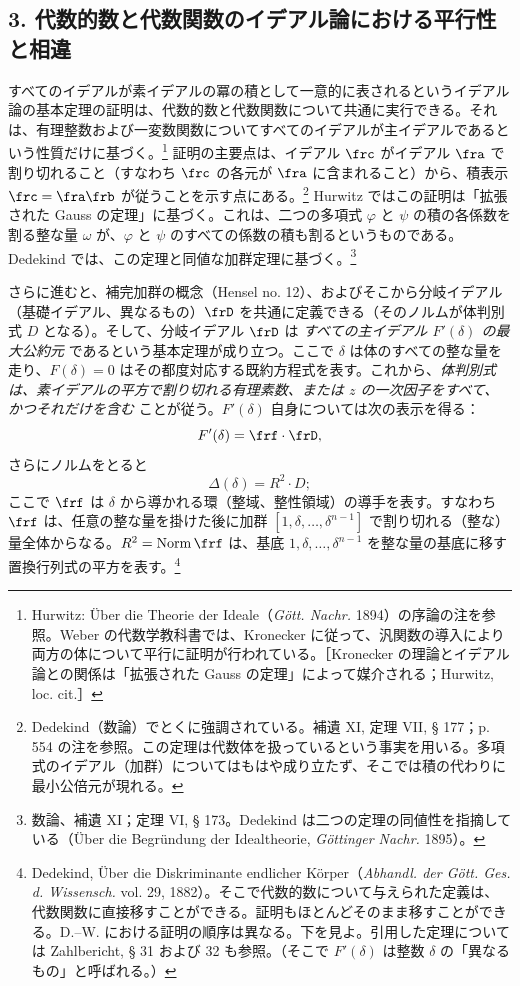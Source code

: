 \documentclass[11pt]{article}
\begin{document}
\subsection*{3. 代数的数と代数関数のイデアル論における平行性と相違}
すべてのイデアルが素イデアルの冪の積として一意的に表されるというイデアル論の基本定理の証明は、代数的数と代数関数について共通に実行できる。それは、有理整数および一変数関数についてすべてのイデアルが主イデアルであるという性質だけに基づく。\footnote{Hurwitz: Über die Theorie der Ideale（\emph{Gött. Nachr.} 1894）の序論の注を参照。Weber の代数学教科書では、Kronecker に従って、汎関数の導入により両方の体について平行に証明が行われている。［Kronecker の理論とイデアル論との関係は「拡張された Gauss の定理」によって媒介される；Hurwitz, loc. cit.］} 証明の主要点は、イデアル \(\frc\) がイデアル \(\fra\) で割り切れること（すなわち \(\frc\) の各元が \(\fra\) に含まれること）から、積表示 \(\frc=\fra\frb\) が従うことを示す点にある。\footnote{Dedekind（数論）でとくに強調されている。補遺 XI, 定理 VII, § 177；p. 554 の注を参照。この定理は代数体を扱っているという事実を用いる。多項式のイデアル（加群）についてはもはや成り立たず、そこでは積の代わりに最小公倍元が現れる。} Hurwitz ではこの証明は「拡張された Gauss の定理」に基づく。これは、二つの多項式 \(\varphi\) と \(\psi\) の積の各係数を割る整な量 \(\omega\) が、\(\varphi\) と \(\psi\) のすべての係数の積も割るというものである。Dedekind では、この定理と同値な加群定理に基づく。\footnote{数論、補遺 XI；定理 VI, § 173。Dedekind は二つの定理の同値性を指摘している（Über die Begründung der Idealtheorie, \emph{Göttinger Nachr.} 1895）。}

さらに進むと、補完加群の概念（Hensel no. 12）、およびそこから分岐イデアル（基礎イデアル、異なるもの）\(\frD\) を共通に定義できる（そのノルムが体判別式 \(D\) となる）。そして、分岐イデアル \(\frD\) は \emph{すべての主イデアル \(F'(\delta)\) の最大公約元} であるという基本定理が成り立つ。ここで \(\delta\) は体のすべての整な量を走り、\(F(\delta)=0\) はその都度対応する既約方程式を表す。これから、\emph{体判別式は、素イデアルの平方で割り切れる有理素数、または \(z\) の一次因子をすべて、かつそれだけを含む} ことが従う。\(F'(\delta)\) 自身については次の表示を得る：
\[
F'(\delta)=\frf\cdot\frD,
\]
さらにノルムをとると
\[
\Delta(\delta)=R^2\cdot D;
\]
ここで \(\frf\) は \(\delta\) から導かれる環（整域、整性領域）の導手を表す。すなわち \(\frf\) は、任意の整な量を掛けた後に加群 \([1,\delta,\ldots,\delta^{n-1}]\) で割り切れる（整な）量全体からなる。\(R^2=\operatorname{Norm}\frf\) は、基底 \(1,\delta,\ldots,\delta^{n-1}\) を整な量の基底に移す置換行列式の平方を表す。\footnote{Dedekind, Über die Diskriminante endlicher Körper（\emph{Abhandl. der Gött. Ges. d. Wissensch.} vol. 29, 1882）。そこで代数的数について与えられた定義は、代数関数に直接移すことができる。証明もほとんどそのまま移すことができる。D.--W. における証明の順序は異なる。下を見よ。引用した定理については Zahlbericht, § 31 および 32 も参照。（そこで \(F'(\delta)\) は整数 \(\delta\) の「異なるもの」と呼ばれる。）}
\end{document}
